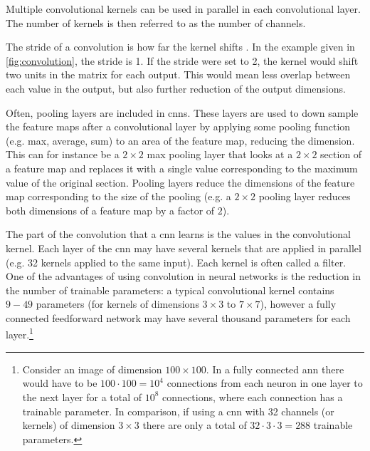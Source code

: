 Multiple convolutional kernels can be used in parallel in each convolutional layer. The number of kernels is then referred to as the number of channels. 

The stride of a convolution is how far the kernel shifts \cite{oshea2015introduction}. In the example given in \cref{fig:convolution}, the stride is 1. If the stride were set to 2, the kernel would shift two units in the matrix for each output. This would mean less overlap between each value in the output, but also further reduction of the output dimensions. 

Often, pooling layers are included in \gls{cnn}s. These layers are used to down sample the feature maps after a convolutional layer by applying some pooling function (e.g. max, average, sum) to an area of the feature map, reducing the dimension. This can for instance be a $2\times2$ max pooling layer that looks at a $2\times2$ section of a feature map and replaces it with a single value corresponding to the maximum value of the original section. Pooling layers reduce the dimensions of the feature map corresponding to the size of the pooling (e.g. a $2\times2$ pooling layer reduces both dimensions of a feature map by a factor of $2$). 

The part of the convolution that a \gls{cnn} learns is the values in the convolutional kernel. Each layer of the \gls{cnn} may have several kernels that are applied in parallel (e.g. 32 kernels applied to the same input). Each kernel is often called a filter. One of the advantages of using convolution in neural networks is the reduction in the number of trainable parameters: a typical convolutional kernel contains $9-49$ parameters (for kernels of dimensions $3\times3$ to $7\times7$), however a fully connected feedforward network may have several thousand parameters for each layer.\footnote{Consider an image of dimension $100\times100$. In a fully connected \gls{ann} there would have to be $100 \cdot 100 = 10^4$ connections from each neuron in one layer to the next layer for a total of $10^{8}$ connections, where each connection has a trainable parameter. In comparison, if using a \gls{cnn} with 32 channels (or kernels) of dimension $3\times3$ there are only a total of $32 \cdot 3 \cdot 3 = 288$ trainable parameters. } 

